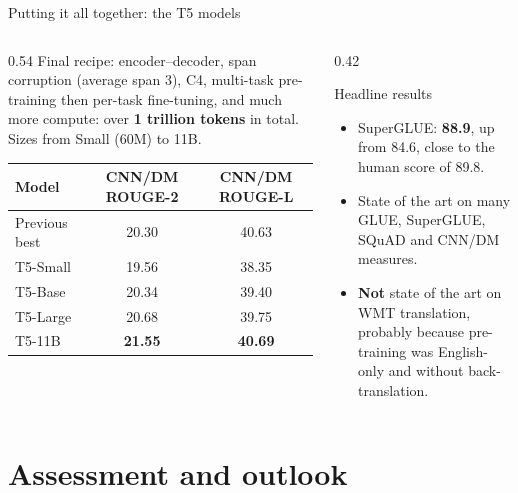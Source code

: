 \documentclass[aspectratio=169,11pt]{beamer}
\begin{document}
\begin{frame}{Putting it all together: the T5 models}
  \begin{columns}[T]
    \begin{column}{0.54\textwidth}
      \small
      Final recipe: encoder--decoder, span corruption (average span 3), C4, multi-task pre-training then per-task fine-tuning, and much more compute: over \textbf{1 trillion tokens} in total. Sizes from Small (60M) to 11B.
      \vspace{1mm}

      \footnotesize
      \begin{tabular}{@{}lcc@{}}
        \toprule
        Model & CNN/DM ROUGE-2 & CNN/DM ROUGE-L\\
        \midrule
        Previous best & 20.30 & 40.63\\
        T5-Small & 19.56 & 38.35\\
        T5-Base & 20.34 & 39.40\\
        T5-Large & 20.68 & 39.75\\
        T5-11B & \textbf{21.55} & \textbf{40.69}\\
        \bottomrule
      \end{tabular}
    \end{column}
    \begin{column}{0.42\textwidth}
      \begin{exampleblock}{Headline results}
        \small
        \begin{itemize}
          \item SuperGLUE: \textbf{88.9}, up from 84.6, close to the human score of 89.8.
          \item State of the art on many GLUE, SuperGLUE, SQuAD and CNN/DM measures.
          \item \textbf{Not} state of the art on WMT translation, probably because pre-training was English-only and without back-translation.
        \end{itemize}
      \end{exampleblock}
    \end{column}
  \end{columns}
\end{frame}

\section{Assessment and outlook}
\end{document}
